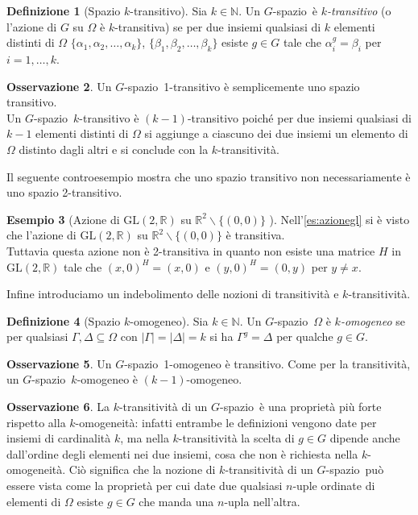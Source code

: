 \documentclass[12pt,a4paper,openright]{report}
\newcommand{\R}{\mathbb{R}} %
\newcommand{\0}{\setminus\{0\}} %
\newcommand{\Gsp}{$G$-spazio~} %
\theoremstyle{definition}
\newtheorem{defn}{Definizione}[chapter]
\newtheorem{oss}[defn]{Osservazione}
\newtheorem{es}[defn]{Esempio}
\theoremstyle{plain}
\begin{document}
\begin{defn}[Spazio $k$-transitivo]
Sia $k \in \mathbb{N}$. Un \Gsp è \emph{$k$-transitivo} (o l'azione di $G$ su $\Omega$ è $k$-transitiva) se per due insiemi qualsiasi di $k$ elementi distinti di $\Omega$ $\{\alpha_1,\alpha_2,\ldots,\alpha_k\}$, $\{\beta_1,\beta_2,\ldots,\beta_k\}$ esiste $g \in G$ tale che $\alpha_i^g=\beta_i$ per $i=1,\ldots,k$.
\end{defn}
\begin{oss}
Un \Gsp 1-transitivo è semplicemente uno spazio transitivo. \\
Un \Gsp $k$-transitivo è $(k-1)$-transitivo poiché per due insiemi qualsiasi di $k-1$ elementi distinti di $\Omega$ si aggiunge a ciascuno dei due insiemi un elemento di $\Omega$ distinto dagli altri e si conclude con la $k$-transitività.
\end{oss}
Il seguente controesempio mostra che uno spazio transitivo non necessariamente è uno spazio 2-transitivo.
\begin{es}[Azione di $\mathrm{GL}(2,\R)$ su $\R^2\backslash \{(0,0)\}$ ]
Nell'\cref{es:azionegl} si è visto che l'azione di $\mathrm{GL}(2,\R)$ su $\R^2\backslash \{(0,0)\}$ è transitiva.\\
Tuttavia questa azione non è 2-transitiva in quanto non esiste una matrice $H$ in $\mathrm{GL}(2,\R)$ tale che $(x,0)^H=(x,0)$ e  $(y,0)^H=(0,y)$ per $y \neq x$.
\end{es}

Infine introduciamo un indebolimento delle nozioni di transitività e $k$-transitività.

\begin{defn}[Spazio $k$-omogeneo]
Sia $k \in \mathbb{N}$. Un \Gsp $\Omega$ è \emph{$k$-omogeneo} se per qualsiasi $\Gamma,\Delta \subseteq \Omega$ con $|\Gamma|=|\Delta|=k$ si ha $\Gamma^g=\Delta$ per qualche $g \in G$.
\end{defn}

\begin{oss} \label{os:auttrans}
Un \Gsp 1-omogeneo è transitivo. Come per la transitività, un \Gsp $k$-omogeneo è $(k-1)$-omogeneo.
\end{oss}

\begin{oss}
La $k$-transitività di un \Gsp è una proprietà più forte rispetto alla $k$-omogeneità: infatti entrambe le definizioni vengono date per insiemi di cardinalità $k$, ma nella $k$-transitività la scelta di $g \in G$ dipende anche dall'ordine degli elementi nei due insiemi, cosa che non è richiesta nella $k$-omogeneità. \newline 
Ciò significa che la nozione di $k$-transitività di un \Gsp può essere vista come la proprietà per cui date due qualsiasi $n$-uple ordinate di elementi di $\Omega$ esiste $g \in G$ che manda una $n$-upla nell'altra.
\end{oss}
\end{document}
